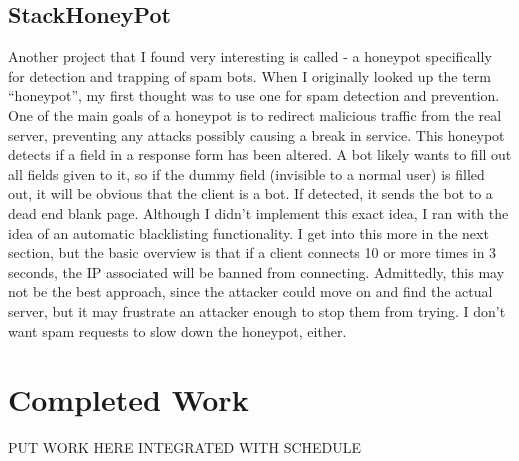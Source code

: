 \documentclass[12pt]{article}
\begin{document}
\subsection{StackHoneyPot}
Another project that I found very interesting is called  - a honeypot specifically for detection and trapping of spam bots.
When I originally looked up the term ``honeypot'', my first thought was to use one for spam detection and prevention.
One of the main goals of a honeypot is to redirect malicious traffic from the real server, preventing any attacks possibly causing a break in service.
This honeypot detects if a field in a response form has been altered.
A bot likely wants to fill out all fields given to it, so if the dummy field (invisible to a normal user) is filled out, it will be obvious that the client is a bot.
If detected, it sends the bot to a dead end blank page.
Although I didn't implement this exact idea, I ran with the idea of an automatic blacklisting functionality.
I get into this more in the next section, but the basic overview is that if a client connects 10 or more times in 3 seconds, the IP associated will be banned from connecting.
Admittedly, this may not be the best approach, since the attacker could move on and find the actual server, but it may frustrate an attacker enough to stop them from trying.
I don't want spam requests to slow down the honeypot, either.


\section{Completed Work}

PUT WORK HERE INTEGRATED WITH SCHEDULE
\end{document}
